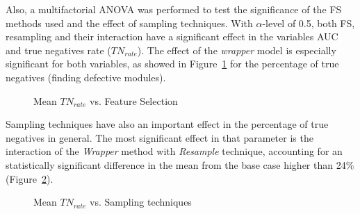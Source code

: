 \documentclass{elsart}
\begin{document}
Also, a multifactorial ANOVA was performed to test the significance of the FS methods used and the effect of sampling techniques. With $\alpha$-level of 0.5, both FS, resampling and their interaction have a significant effect in the variables AUC and true negatives rate ($TN_{rate}$). The effect of the \emph{wrapper} model is especially significant for both variables, as showed in
Figure~\ref{fig:AnovaMeanFS} for the percentage of true negatives (finding defective modules).


\begin{figure}%
  \centering
  \caption{Mean $TN_{rate}$ vs. Feature Selection}
  \label{fig:AnovaMeanFS}%
\end{figure}

Sampling techniques have also an important effect in the percentage of true negatives in general. The most significant effect in that parameter is the interaction of the \emph{Wrapper} method with \emph{Resample} technique, accounting for an statistically
significant difference in the mean from the base case higher than 24\% (Figure~\ref{fig:AnovaMeanSampling}).

\begin{figure}%
  \centering
  \caption{Mean $TN_{rate}$ vs. Sampling techniques}
  \label{fig:AnovaMeanSampling}%
\end{figure}




%
\end{document}
